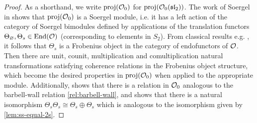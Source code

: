

\begin{proof}
    As a shorthand, we write $\operatorname{proj}(\mathcal{O}_0)$ for $\operatorname{proj}(\mathcal{O}_0(\operatorname{\mathfrak{sl}}_2))$. The work of Soergel in \cite[Section 2.4]{soergel-category-O} shows that $\operatorname{proj}(\mathcal{O}_0)$ is a Soergel module, i.e. it has a left action of the category of Soergel bimodules defined by applications of the translation functors $\Theta_\varnothing, \Theta_s \in \operatorname{End}(\mathcal{O})$ (corresponding to elements in $S_2$).  From classical results e.g. \cite[Proposition 5.84 and Lemma 5.87]{mazorchuk-lectures-sl2-modules}, it follows that $\Theta_s$ is a Frobenius object in the category of endofunctors of $\mathcal{O}$. Then there are unit, counit, multiplication and comultiplication natural transformations satisfying coherence relations in the Frobenius object structure, which become the desired properties in $\operatorname{proj}(\mathcal{O}_0)$ when applied to the appropriate module. Additionally, \cite[Section 2.4]{soergel-category-O} shows that there is a relation in $\mathcal{O}_0$ analogous to the barbell-wall relation \eqref{rel:barbell-wall}, and \cite[Proposition 5.90]{mazorchuk-lectures-sl2-modules} shows that there is a natural isomorphism $\Theta_s \Theta_s \cong \Theta_s \oplus \Theta_s$ which is analogous to the isomorphism given by \autoref{lem:ss-equal-2s}.




\end{proof}
